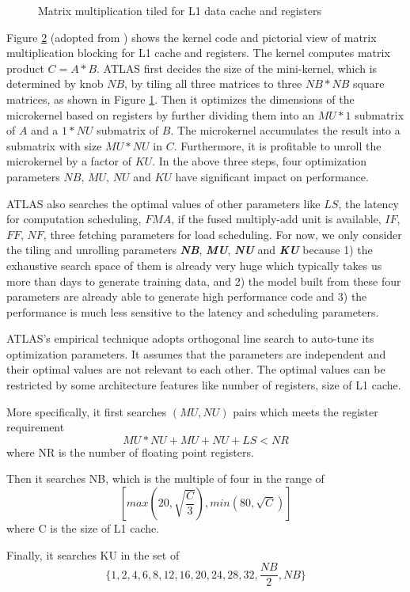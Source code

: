 \begin{figure}
\begin{subfigure}[t]{1.0\linewidth}
    \caption{}
    \label{fig:ATLAS_pic}
  \end{subfigure}
  \caption{Matrix multiplication tiled for L1 data cache and registers}
  \label{fig:ATLAS}
\end{figure}

  Figure \ref{fig:ATLAS} (adopted from \cite{yotov2005search}) shows the kernel code and pictorial view of matrix multiplication
  blocking for L1 cache and registers. The kernel computes matrix product $C=A*B$. ATLAS first decides the size of the mini-kernel, which is determined
  by knob $NB$, by tiling all three matrices
  to three $NB*NB$ square matrices, as shown in Figure \ref{fig:ATLAS_pic}. Then it optimizes the dimensions of the microkernel based on registers by further dividing them into an $MU*1$ submatrix of $A$ and a $1*NU$ submatrix of $B$. The microkernel accumulates the result into a submatrix with size $MU*NU$ in $C$.
  Furthermore, it is profitable to unroll the microkernel by a factor of $KU$.
  In the above three steps, four optimization parameters $NB$, $MU$, $NU$ and $KU$ have significant impact on performance. \par

  ATLAS also searches the optimal values of other parameters like $LS$, the latency for computation scheduling, $FMA$, if the fused multiply-add unit is available, $IF$, $FF$, $NF$, three fetching parameters
  for load scheduling. For now, we only consider the tiling and unrolling parameters \textbf{\textit{NB}}, \textbf{\textit{MU}}, \textbf{\textit{NU}} and \textbf{\textit{KU}} because 1) the exhaustive search space of them
  is already very huge which typically takes us more than days to generate training data, and 2) the model built from these four parameters are already able to
  generate high performance code and 3) the performance is much less sensitive to the latency and scheduling parameters.
  \par

  ATLAS's empirical technique adopts orthogonal line search to auto-tune its optimization parameters.
  It assumes that the parameters are independent and their optimal values are not relevant to each other. The optimal values can be
  restricted by some architecture features like number of registers, size of L1 cache.\par
  More specifically, it first searches $(MU, NU)$ pairs which meets the register requirement
  \[ MU*NU + MU + NU + LS < NR \]
  where NR is the number of floating point registers.\par
  Then it searches NB, which is the multiple of four in the range of
  \[ [max(20, \sqrt{\frac{C}{3}}), min(80, \sqrt{C}) ] \]
  where C is the size of L1 cache.
  \par
  Finally, it searches KU in the set of
  \[ \{1, 2, 4, 6, 8, 12, 16, 20, 24, 28, 32, \frac{NB}{2}, NB \} \]

